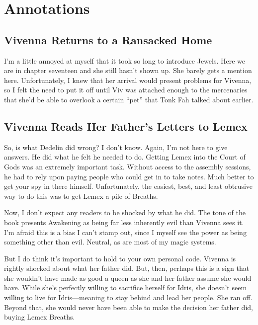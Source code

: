 \section*{Annotations}

\subsection*{Vivenna Returns to a Ransacked Home}

I’m a little annoyed at myself that it took so long to introduce Jewels. Here we are in chapter seventeen and she still hasn’t shown up. She barely gets a mention here. Unfortunately, I knew that her arrival would present problems for Vivenna, so I felt the need to put it off until Viv was attached enough to the mercenaries that she’d be able to overlook a certain “pet” that Tonk Fah talked about earlier.

\subsection*{Vivenna Reads Her Father’s Letters to Lemex}

So, is what Dedelin did wrong? I don’t know. Again, I’m not here to give answers. He did what he felt he needed to do. Getting Lemex into the Court of Gods was an extremely important task. Without access to the assembly sessions, he had to rely upon paying people who could get in to take notes. Much better to get your spy in there himself. Unfortunately, the easiest, best, and least obtrusive way to do this was to get Lemex a pile of Breaths.

Now, I don’t expect any readers to be shocked by what he did. The tone of the book presents Awakening as being far less inherently evil than Vivenna sees it. I’m afraid this is a bias I can’t stamp out, since I myself see the power as being something other than evil. Neutral, as are most of my magic systems.

But I do think it’s important to hold to your own personal code. Vivenna is rightly shocked about what her father did. But, then, perhaps this is a sign that she wouldn’t have made as good a queen as she and her father assume she would have. While she’s perfectly willing to sacrifice herself for Idris, she doesn’t seem willing to live for Idris—meaning to stay behind and lead her people. She ran off. Beyond that, she would never have been able to make the decision her father did, buying Lemex Breaths.



